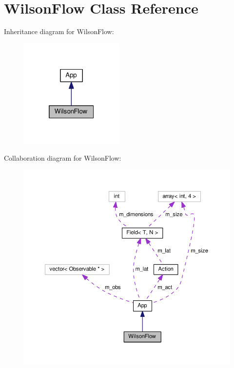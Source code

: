 \hypertarget{classWilsonFlow}{}\section{Wilson\+Flow Class Reference}
\label{classWilsonFlow}


Inheritance diagram for Wilson\+Flow\+:\nopagebreak
\begin{figure}[H]
\begin{center}
\leavevmode
\includegraphics[width=148pt]{classWilsonFlow__inherit__graph}
\end{center}
\end{figure}


Collaboration diagram for Wilson\+Flow\+:\nopagebreak
\begin{figure}[H]
\begin{center}
\leavevmode
\includegraphics[width=350pt]{classWilsonFlow__coll__graph}
\end{center}
\end{figure}
